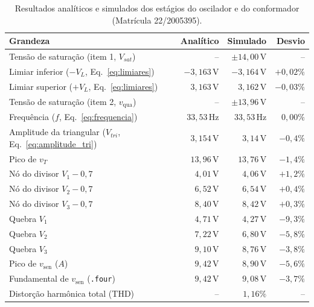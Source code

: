 \documentclass[11pt,a4paper]{article}
\begin{document}
\begin{table}[H]
    \centering
    \caption{Resultados analíticos e simulados dos estágios do oscilador e do conformador (Matrícula 22/2005395).}
    \label{tab:resultados_lurian}
    \renewcommand{\arraystretch}{1.2}
    \begin{tabular}{@{}lrrr@{}}
    \toprule
    \textbf{Grandeza} & \textbf{Analítico} & \textbf{Simulado} & \textbf{Desvio} \\
    \midrule
    Tensão de saturação (item 1, $V_{sat}$) & -- & $\pm14{,}00\,\text{V}$ & -- \\
    Limiar inferior ($-V_L$, Eq.~\ref{eq:limiares}) & $-3{,}163\,\text{V}$ & $-3{,}164\,\text{V}$ & $+0{,}02\%$ \\
    Limiar superior ($+V_L$, Eq.~\ref{eq:limiares}) & $3{,}163\,\text{V}$ & $3{,}162\,\text{V}$ & $-0{,}03\%$ \\
    \midrule
    Tensão de saturação (item 2, $v_{\text{qua}}$) & -- & $\pm13{,}96\,\text{V}$ & -- \\
    Frequência ($f$, Eq.~\ref{eq:frequencia}) & $33{,}53\,\text{Hz}$ & $33{,}53\,\text{Hz}$ & $0{,}00\%$ \\
    Amplitude da triangular ($V_{tri}$, Eq.~\ref{eq:amplitude_tri}) & $3{,}154\,\text{V}$ & $3{,}14\,\text{V}$ & $-0{,}4\%$ \\
    \midrule
    Pico de $v_T$ & $13{,}96\,\text{V}$ & $13{,}76\,\text{V}$ & $-1{,}4\%$ \\
    Nó do divisor $V_1-0{,}7$ & $4{,}01\,\text{V}$ & $4{,}06\,\text{V}$ & $+1{,}2\%$ \\
    Nó do divisor $V_2-0{,}7$ & $6{,}52\,\text{V}$ & $6{,}54\,\text{V}$ & $+0{,}4\%$ \\
    Nó do divisor $V_3-0{,}7$ & $8{,}40\,\text{V}$ & $8{,}42\,\text{V}$ & $+0{,}3\%$ \\
    Quebra $V_1$ & $4{,}71\,\text{V}$ & $4{,}27\,\text{V}$ & $-9{,}3\%$ \\
    Quebra $V_2$ & $7{,}22\,\text{V}$ & $6{,}80\,\text{V}$ & $-5{,}8\%$ \\
    Quebra $V_3$ & $9{,}10\,\text{V}$ & $8{,}76\,\text{V}$ & $-3{,}8\%$ \\
    Pico de $v_{\text{sen}}$ ($A$) & $9{,}42\,\text{V}$ & $8{,}90\,\text{V}$ & $-5{,}6\%$ \\
    Fundamental de $v_{\text{sen}}$ (\texttt{.four}) & $9{,}42\,\text{V}$ & $9{,}08\,\text{V}$ & $-3{,}7\%$ \\
    Distorção harmônica total (THD) & -- & $1{,}16\%$ & -- \\
    \bottomrule
    \end{tabular}
\end{table}
\end{document}
